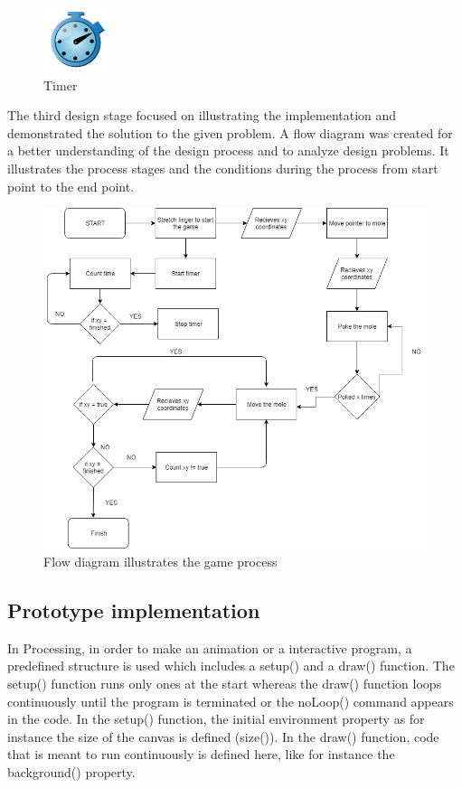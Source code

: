 \begin{figure}[h]
  \centering
  \includegraphics[width=.1\textwidth]{figures/timer.png}
  \caption[Timer]{Timer}
\end{figure}


The third design stage focused on illustrating the implementation and demonstrated the solution to the given problem.
A flow diagram was created for a better understanding of the design process and to analyze design problems. It illustrates the process stages and the conditions during the process from start point to the end point. 

\break

\begin{figure}[h]
    \centering
    \includegraphics[width=.8\textwidth]{figures/FlowDiagram.jpg}
    \caption[Flow diagram: game design]{Flow diagram illustrates the game process}
    \label{fig: flowdiagram}
\end{figure}


\subsection{Prototype implementation}

In Processing, in order to make an animation or a interactive program, a predefined structure is used which includes a setup() and a draw() function. The setup() function runs only ones at the start whereas the draw() function loops continuously until the program is terminated or the noLoop() command appears in the code.
In the setup() function, the initial environment property as for instance the size of the canvas is defined  (size()).  In the draw() function, code that is meant to run continuously is defined here, like for instance the background() property. 

